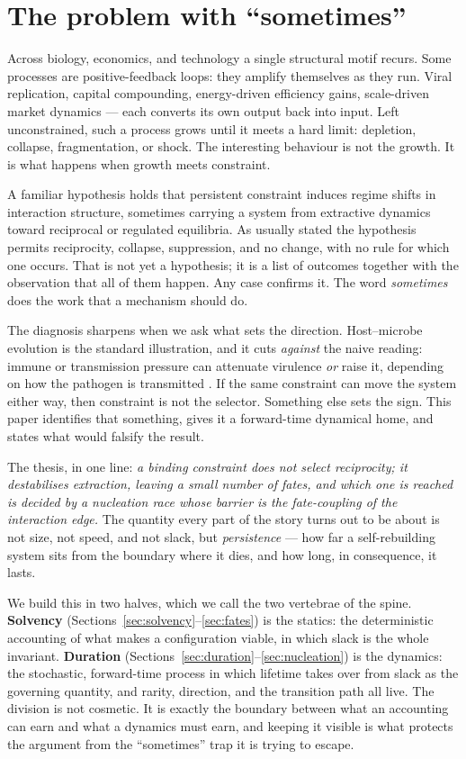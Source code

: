 \documentclass[11pt]{article}
\theoremstyle{plain}
\theoremstyle{definition}
\begin{document}
\tableofcontents

\section{The problem with ``sometimes''}

Across biology, economics, and technology a single structural motif recurs. Some processes are positive-feedback loops: they amplify themselves as they run. Viral replication, capital compounding, energy-driven efficiency gains, scale-driven market dynamics --- each converts its own output back into input. Left unconstrained, such a process grows until it meets a hard limit: depletion, collapse, fragmentation, or shock. The interesting behaviour is not the growth. It is what happens when growth meets constraint.

A familiar hypothesis holds that persistent constraint induces regime shifts in interaction structure, sometimes carrying a system from extractive dynamics toward reciprocal or regulated equilibria. As usually stated the hypothesis permits reciprocity, collapse, suppression, and no change, with no rule for which one occurs. That is not yet a hypothesis; it is a list of outcomes together with the observation that all of them happen. Any case confirms it. The word \emph{sometimes} does the work that a mechanism should do.

The diagnosis sharpens when we ask what sets the direction. Host--microbe evolution is the standard illustration, and it cuts \emph{against} the naive reading: immune or transmission pressure can attenuate virulence \emph{or} raise it, depending on how the pathogen is transmitted \cite{ewald1994,frank1996,andersonmay1991}. If the same constraint can move the system either way, then constraint is not the selector. Something else sets the sign. This paper identifies that something, gives it a forward-time dynamical home, and states what would falsify the result.

The thesis, in one line: \emph{a binding constraint does not select reciprocity; it destabilises extraction, leaving a small number of fates, and which one is reached is decided by a nucleation race whose barrier is the fate-coupling of the interaction edge.} The quantity every part of the story turns out to be about is not size, not speed, and not slack, but \emph{persistence} --- how far a self-rebuilding system sits from the boundary where it dies, and how long, in consequence, it lasts.

We build this in two halves, which we call the two vertebrae of the spine. \textbf{Solvency} (Sections~\ref{sec:solvency}--\ref{sec:fates}) is the statics: the deterministic accounting of what makes a configuration viable, in which slack is the whole invariant. \textbf{Duration} (Sections~\ref{sec:duration}--\ref{sec:nucleation}) is the dynamics: the stochastic, forward-time process in which lifetime takes over from slack as the governing quantity, and rarity, direction, and the transition path all live. The division is not cosmetic. It is exactly the boundary between what an accounting can earn and what a dynamics must earn, and keeping it visible is what protects the argument from the ``sometimes'' trap it is trying to escape.
\end{document}
